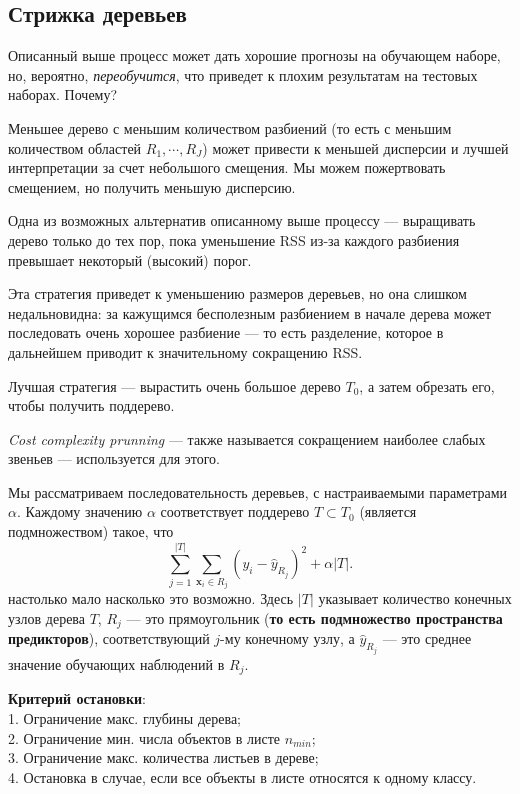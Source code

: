 \documentclass{article}
\theoremstyle{definition}
\theoremstyle{theorem}
\theoremstyle{remark}
\theoremstyle{theorem}
\theoremstyle{example}
\theoremstyle{theorem}
\theoremstyle{theorem}
\theoremstyle{theorem}
\theoremstyle{theorem}
\begin{document}
\subsection{Стрижка деревьев}

Описанный выше процесс может дать хорошие прогнозы на обучающем наборе, но, вероятно, \textit{переобучится}, что приведет к плохим результатам на тестовых наборах. Почему?

Меньшее дерево с меньшим количеством разбиений (то есть с меньшим количеством областей $R_1, \cdots, R_J$) может привести к меньшей дисперсии и лучшей интерпретации за счет небольшого смещения. Мы можем пожертвовать смещением, но получить меньшую дисперсию.

Одна из возможных альтернатив описанному выше процессу --- выращивать дерево только до тех пор, пока уменьшение RSS из-за каждого разбиения превышает некоторый (высокий) порог.

Эта стратегия приведет к уменьшению размеров деревьев, но она слишком недальновидна: за кажущимся бесполезным разбиением в начале дерева может последовать очень хорошее разбиение --- то есть разделение, которое в дальнейшем приводит к значительному сокращению RSS.

Лучшая стратегия --- вырастить очень большое дерево $T_0$, а затем обрезать его, чтобы получить поддерево.

\textit{Cost complexity prunning} --- также называется сокращением наиболее слабых звеньев --- используется для этого.

Мы рассматриваем последовательность деревьев, с настраиваемыми параметрами $\alpha$. Каждому значению $\alpha$ соответствует поддерево $T \subset T_0$ (является подмножеством) такое, что
\begin{equation}
	\sum\limits_{j=1}^{|T|} \sum\limits_{\textbf{x}_i \in R_j}^{} (y_i - \hat{y}_{R_j})^2 + \alpha |T|.
\end{equation}
настолько мало насколько это возможно. Здесь $|T|$ указывает количество конечных узлов дерева $T$, $R_j$ --- это прямоугольник (\textbf{то есть подмножество пространства предикторов}), соответствующий $j$-му конечному узлу, а $\hat{y}_{R_j}$ --- это среднее значение обучающих наблюдений в $R_j$.

\textbf{Критерий остановки}:\\
1. Ограничение макс. глубины дерева;\\
2. Ограничение мин. числа объектов в листе $n_{min}$;\\
3. Ограничение макс. количества листьев в дереве;\\
4. Остановка в случае, если все объекты в листе относятся к одному классу.
\end{document}
